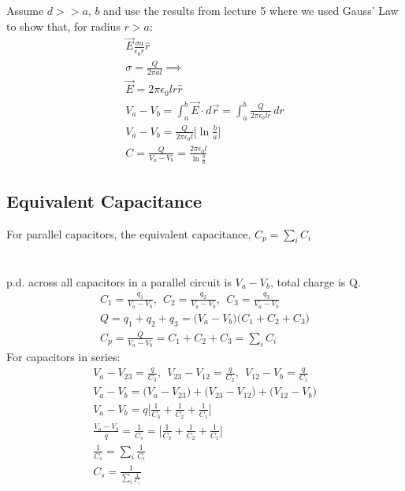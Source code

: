 \documentclass[a4paper, 11pt, fleqn, normalem]{report}
\begin{document}
Assume $d >> a,\,b$ and use the results from lecture 5 where we used Gauss' Law to show that, for radius $r > a$:
\begin{gather*}
    \vec{E} \frac{\sigma a}{\epsilon_{0} r} \hat{r} \\
    \sigma = \frac{Q}{2\pi a l} \implies \\
    \vec{E} = 2\pi \epsilon_{0} l r \hat{r} \\
    V_{a} - V_{b} = \int_{a}^{b} \vec{E} \cdot d\vec{r} = \int_{a}^{b} \frac{Q}{2\pi\epsilon_{0}lr}\,dr \\
    V_{a} - V_{b} = \frac{Q}{2\pi\epsilon_{0}l}\Big[\ln\frac{b}{a}\Big] \\
    C = \frac{Q}{V_{a} - V_{b}} = \frac{2\pi\epsilon_{0}l}{\ln\tfrac{b}{a}}
\end{gather*}

\section{Equivalent Capacitance}
For parallel capacitors, the equivalent capacitance, $C_{p} = \sum_{i} C_{i}$

\chapter{}
p.d. across all capacitors in a parallel circuit is $V_{a} - V_{b}$, total charge is Q.
\begin{gather*}
    C_{1} = \frac{q_{1}}{V_{a} - V_{b}}, ~~ C_{2} = \frac{q_{2}}{V_{a} - V_{b}}, ~~ C_{3} = \frac{q_{3}}{V_{a} - V_{b}} \\
    Q = q_{1} + q_{2} + q_{3} = \big(V_{a} - V_{b} \big) \big(C_{1} + C_{2} + C_{3} \big) \\
    C_{p} = \frac{Q}{V_{a} - V_{b}} = C_{1} + C_{2} + C_{3} = \sum_{i} C_{i}
\end{gather*}
For capacitors in series:
\begin{gather*}
    V_{a} - V_{23} = \frac{q}{C_{3}}, ~~ V_{23} - V_{12} = \frac{q}{C_{2}}, ~~ V_{12} - V_{b} = \frac{q}{C_{1}} \\
    V_{a} - V_{b} = \big(V_{a} - V_{23} \big) + \big(V_{23} - V_{12} \big) + \big(V_{12} - V_{b}\big) \\
    V_{a} - V_{b} = q \Big[\frac{1}{C_{3}} + \frac{1}{C_{2}} + \frac{1}{C_{1}} \Big] \\
    \frac{V_{a} - V_{b}}{q} = \frac{1}{C_{s}} = \Big[\frac{1}{C_{3}} + \frac{1}{C_{2}} + \frac{1}{C_{1}} \Big] \\
    \frac{1}{C_{s}} = \sum_{i} \frac{1}{C_{i}} \\
    C_{s} = \frac{1}{\sum_{i} \tfrac{1}{C_{i}}}
\end{gather*}
\end{document}
